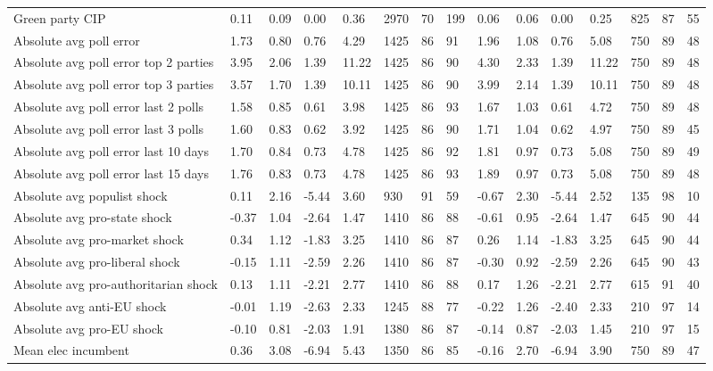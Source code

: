 \begin{longtable}{lllllllllllllll}
Green party CIP & 0.11 & 0.09 & 0.00 & 0.36 & 2970 & 70 & 199 & 0.06 & 0.06 & 0.00 & 0.25 & 825 & 87 & 55\\
Absolute avg poll error & 1.73 & 0.80 & 0.76 & 4.29 & 1425 & 86 & 91 & 1.96 & 1.08 & 0.76 & 5.08 & 750 & 89 & 48\\
Absolute avg poll error top 2 parties & 3.95 & 2.06 & 1.39 & 11.22 & 1425 & 86 & 90 & 4.30 & 2.33 & 1.39 & 11.22 & 750 & 89 & 48\\
\addlinespace
Absolute avg poll error top 3 parties & 3.57 & 1.70 & 1.39 & 10.11 & 1425 & 86 & 90 & 3.99 & 2.14 & 1.39 & 10.11 & 750 & 89 & 48\\
Absolute avg poll error last 2 polls & 1.58 & 0.85 & 0.61 & 3.98 & 1425 & 86 & 93 & 1.67 & 1.03 & 0.61 & 4.72 & 750 & 89 & 48\\
Absolute avg poll error last 3 polls & 1.60 & 0.83 & 0.62 & 3.92 & 1425 & 86 & 90 & 1.71 & 1.04 & 0.62 & 4.97 & 750 & 89 & 45\\
Absolute avg poll error last 10 days & 1.70 & 0.84 & 0.73 & 4.78 & 1425 & 86 & 92 & 1.81 & 0.97 & 0.73 & 5.08 & 750 & 89 & 49\\
Absolute avg poll error last 15 days & 1.76 & 0.83 & 0.73 & 4.78 & 1425 & 86 & 93 & 1.89 & 0.97 & 0.73 & 5.08 & 750 & 89 & 48\\
\addlinespace
Absolute avg populist shock & 0.11 & 2.16 & -5.44 & 3.60 & 930 & 91 & 59 & -0.67 & 2.30 & -5.44 & 2.52 & 135 & 98 & 10\\
Absolute avg pro-state shock & -0.37 & 1.04 & -2.64 & 1.47 & 1410 & 86 & 88 & -0.61 & 0.95 & -2.64 & 1.47 & 645 & 90 & 44\\
Absolute avg pro-market shock & 0.34 & 1.12 & -1.83 & 3.25 & 1410 & 86 & 87 & 0.26 & 1.14 & -1.83 & 3.25 & 645 & 90 & 44\\
Absolute avg pro-liberal shock & -0.15 & 1.11 & -2.59 & 2.26 & 1410 & 86 & 87 & -0.30 & 0.92 & -2.59 & 2.26 & 645 & 90 & 43\\
Absolute avg pro-authoritarian shock & 0.13 & 1.11 & -2.21 & 2.77 & 1410 & 86 & 88 & 0.17 & 1.26 & -2.21 & 2.77 & 615 & 91 & 40\\
\addlinespace
Absolute avg anti-EU shock & -0.01 & 1.19 & -2.63 & 2.33 & 1245 & 88 & 77 & -0.22 & 1.26 & -2.40 & 2.33 & 210 & 97 & 14\\
Absolute avg pro-EU shock & -0.10 & 0.81 & -2.03 & 1.91 & 1380 & 86 & 87 & -0.14 & 0.87 & -2.03 & 1.45 & 210 & 97 & 15\\
Mean elec incumbent & 0.36 & 3.08 & -6.94 & 5.43 & 1350 & 86 & 85 & -0.16 & 2.70 & -6.94 & 3.90 & 750 & 89 & 47\\

\end{longtable}
